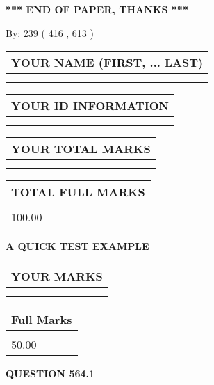 \documentclass[12pt]{article}
\begin{document}
\vspace{1.0in} 
{\textbf{\large{ *** END OF PAPER, THANKS *** }}} 
   
   
\hspace{1.0in} By: 
 239 ( 416 ,  613 )
   
   
   
   
\newpage 
\setcounter{page}{ 
   564001 } 
   
   
   
   
\noindent\begin{tabular}{|l|}
\hline
YOUR NAME (FIRST, ... LAST)  \\
\hline
 \\ 
 \\ 
\hline
\end{tabular}
\hspace{0.05in} \begin{tabular}{|l|}
\hline
 YOUR   ID   INFORMATION  \\
\hline
 \\ 
 \\ 
\hline
\end{tabular}
   
   
\vspace{0.2in}\noindent\begin{tabular}{|l|}
\hline
YOUR TOTAL MARKS  \\
\hline
 \\ 
 \\ 
\hline
\end{tabular}
\hspace{0.05in} \begin{tabular}{|l|}
\hline
TOTAL FULL MARKS  \\
\hline
 \\ 
100.00 \\
\hline
\end{tabular}
   
   
 \vspace{0.2in}
{\LARGE {\textbf{ A QUICK TEST EXAMPLE}}}
   
   
  
\vspace{0.2in}
  
\noindent\begin{tabular}{|l|}
\hline
 YOUR MARKS  \\
\hline
 \\ 
 \\ 
\hline
\end{tabular}
\hspace{0.05in} \begin{tabular}{|l|}
\hline
 Full Marks  \\
\hline
 \\ 
50.00 \\
\hline
\end{tabular}
{\textbf{\Large{QUESTION
564.1 
}}}
  
\end{document}
